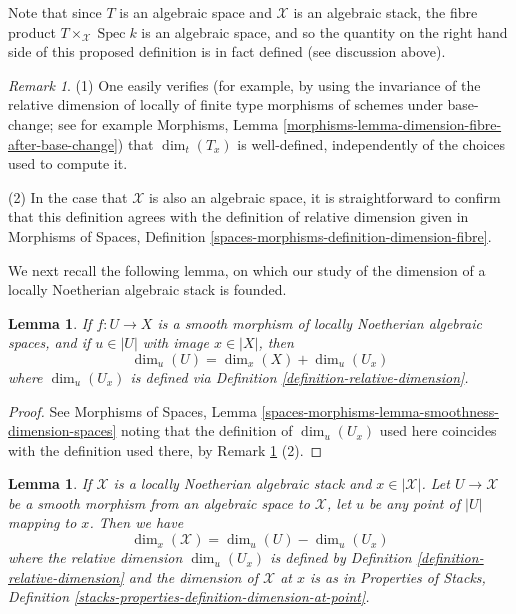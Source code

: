 \documentclass{stacks-project}
\theoremstyle{plain}
\newtheorem{lemma}[subsection]{Lemma}
\theoremstyle{definition}
\theoremstyle{remark}
\newtheorem{remark}[subsection]{Remark}
\numberwithin{equation}{subsection}
\def\Spec{\mathop{\mathrm{Spec}}}
\begin{document}
\noindent
Note that since $T$ is an algebraic space and $\mathcal{X}$ is an
algebraic stack, the fibre product $T \times_{\mathcal{X}} \Spec k$
is an algebraic space, and so the quantity on the right hand side of
this proposed definition is in fact defined (see discussion above).

\begin{remark}
\label{remark-relative-dimension}
(1)
One easily verifies (for example, by using the invariance
of the relative dimension of locally of finite type morphisms of schemes
under base-change; see for example
Morphisms, Lemma \ref{morphisms-lemma-dimension-fibre-after-base-change})
that $\dim_t(T_x)$ is well-defined, independently of the choices
used to compute it.

\medskip\noindent
(2)
In the case that $\mathcal{X}$ is also an algebraic space,
it is straightforward to confirm that this definition agrees with
the definition of relative dimension given in
Morphisms of Spaces, Definition
\ref{spaces-morphisms-definition-dimension-fibre}.
\end{remark}

\noindent
We next recall the following lemma, on which our study of
the dimension of a locally Noetherian algebraic stack is founded.

\begin{lemma}
\label{lemma-behaviour-of-dimensions-wrt-smooth-morphisms}
If $f: U \to X$ is a smooth morphism of locally Noetherian algebraic
spaces, and
if $u \in |U|$ with image $x \in |X|$, then
$$
\dim_u (U) = \dim_x(X) + \dim_{u} (U_x)
$$
where $\dim_u (U_x)$ is defined via
Definition \ref{definition-relative-dimension}.
\end{lemma}

\begin{proof}
See Morphisms of Spaces, Lemma
\ref{spaces-morphisms-lemma-smoothness-dimension-spaces}
noting that the definition of $\dim_u (U_x)$ used here coincides with
the definition used there, by Remark \ref{remark-relative-dimension} (2).
\end{proof}

\begin{lemma}
\label{lemma-dimension-for-stacks}
If $\mathcal{X}$ is a locally Noetherian algebraic stack and
$x \in |\mathcal{X}|$. Let $U \to \mathcal{X}$ be a smooth morphism
from an algebraic space to $\mathcal{X}$, let $u$ be any point of $|U|$
mapping to $x$. Then we have
$$
\dim_x(\mathcal{X}) =  \dim_u(U) - \dim_{u}(U_x)
$$
where the relative dimension $\dim_u(U_x)$ is defined
by Definition \ref{definition-relative-dimension} and the
dimension of $\mathcal{X}$ at $x$ is as in
Properties of Stacks, Definition
\ref{stacks-properties-definition-dimension-at-point}.
\end{lemma}
\end{document}
